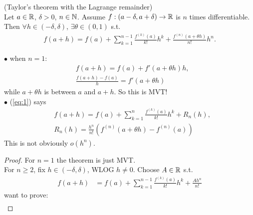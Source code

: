 \documentclass[a4paper]{article}
\begin{document}
\begin{thm}(Taylor's theorem with the Lagrange remainder)\\
Let $a\in\mathbb{R}$, $\delta>0$, $n\in\mathbb{N}$. Assume $f:\left(a-\delta,a+\delta\right)\to\mathbb{R}$ is $n$ times differentiable. Then $\forall h\in\left(-\delta,\delta\right)$, $\exists \theta\in\left(0,1\right)$ s.t.
\begin{equation*}
\begin{aligned}
f\left(a+h\right) = f\left(a\right)+\sum_{k=1}^{n-1} \frac{f^{\left(k\right)}\left(a\right)}{k!}
h^k + \frac{f^{\left(n\right)}\left(a+\theta h\right)}{n!}h^n.
\end{aligned}
\end{equation*}
\begin{rem}
$\bullet$ when $n=1$:
\begin{equation*}
\begin{aligned}
&f\left(a+h\right) = f\left(a\right) + f'\left(a+\theta h\right)h,\\
&\frac{f\left(a+h\right)-f\left(a\right)}{h} = f'\left(a+\theta h\right)
\end{aligned}
\end{equation*}
while $a+\theta h$ is between $a$ and $a+h$. So this is MVT!\\
$\bullet$ (\ref{eq:1}) says
\begin{equation*}
\begin{aligned}
&f\left(a+h\right)=f\left(a\right)+\sum_{k=1}^n \frac{f^{\left(k\right)}\left(a\right)}{k!}h^k +R_n\left(h\right),\\
&R_n\left(h\right)=\frac{h^n}{n!}\left(f^{\left(n\right)}\left(a+\theta h\right) - f^{\left(n\right)} \left(a\right)\right)
\end{aligned}
\end{equation*}
This is not obviously $o\left(h^n\right)$.
\end{rem}
\begin{proof}
For $n=1$ the theorem is just MVT.\\
For $n \geq 2$, fix $h\in\left(-\delta,\delta\right)$, WLOG $h\neq 0$. Choose $A\in \mathbb{R}$ s.t.
\begin{equation*}
\begin{aligned}
f\left(a+h\right) &= f\left(a\right)+\sum_{k=1}^{n-1} \frac{f^{\left(k\right)}\left(a\right)}{k!}h^k + \frac{A h^n}{n!}
\end{aligned}
\end{equation*}
want to prove:
\begin{equation*}
\begin{aligned}

\end{aligned}
\end{equation*}
\end{proof}
\end{thm}
\end{document}
